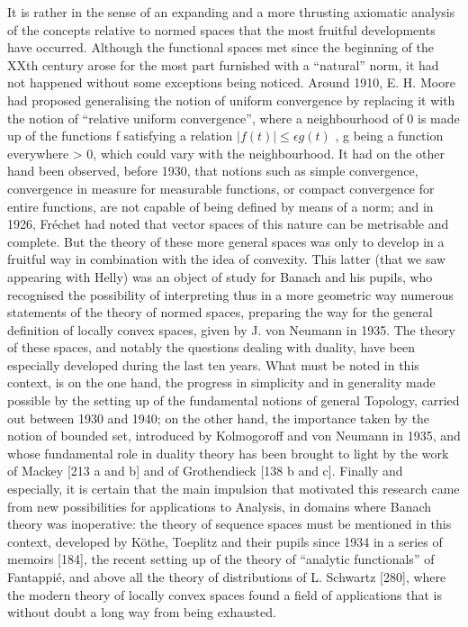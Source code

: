 It is rather in the sense of an expanding and a more thrusting axiomatic analysis of the concepts relative to normed spaces that the most fruitful developments have occurred. Although the functional spaces met since the beginning of the XXth century arose for the most part furnished with a ``natural'' norm, it had not happened without some exceptions being noticed. Around 1910, E. H. Moore had proposed generalising the notion of uniform convergence by replacing it with the notion of ``relative uniform convergence'', where a neighbourhood of 0 is made up of the functions f satisfying a relation \(|f(t)| \leq \epsilon g(t)\) , g being a function everywhere \textgreater{} 0, which could vary with the neighbourhood. It had on the other hand been observed, before 1930, that notions such as simple convergence, convergence in measure for measurable functions, or compact convergence for entire functions, are not capable of being defined by means of a norm; and in 1926, Fréchet had noted that vector spaces of this nature can be metrisable and complete. But the theory of these more general spaces was only to develop in a fruitful way in combination with the idea of convexity. This latter (that we saw appearing with Helly) was an object of study for Banach and his pupils, who recognised the possibility of interpreting thus in a more geometric way numerous statements of the theory of normed spaces, preparing the way for the general definition of locally convex spaces, given by J. von Neumann in 1935. The theory of these spaces, and notably the questions dealing with duality, have been especially developed during the last ten years. What must be noted in this context, is on the one hand, the progress in simplicity and in generality made possible by the setting up of the fundamental notions of general Topology, carried out between 1930 and 1940; on the other hand, the importance taken by the notion of bounded set, introduced by Kolmogoroff and von Neumann in 1935, and whose fundamental role in duality theory has been brought to light by the work of Mackey {[}213 a and b{]} and of Grothendieck {[}138 b and c{]}. Finally and especially, it is certain that the main impulsion that motivated this research came from new possibilities for applications to Analysis, in domains where Banach theory was inoperative: the theory of sequence spaces must be mentioned in this context, developed by Köthe, Toeplitz and their pupils since 1934 in a series of memoirs {[}184{]}, the recent setting up of the theory of ``analytic functionals'' of Fantappié, and above all the theory of distributions of L. Schwartz {[}280{]}, where the modern theory of locally convex spaces found a field of applications that is without doubt a long way from being exhausted.


